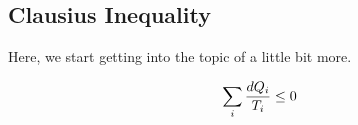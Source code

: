 \subsection{Clausius Inequality}\label{subsec:Clausius_Inequality}
Here, we start getting into the topic of  a little bit more.

\begin{equation}\label{eq:Clausius_Inequality}
  \sum\limits_{i} \frac{d Q_{i}}{T_{i}} \leq 0
\end{equation}


